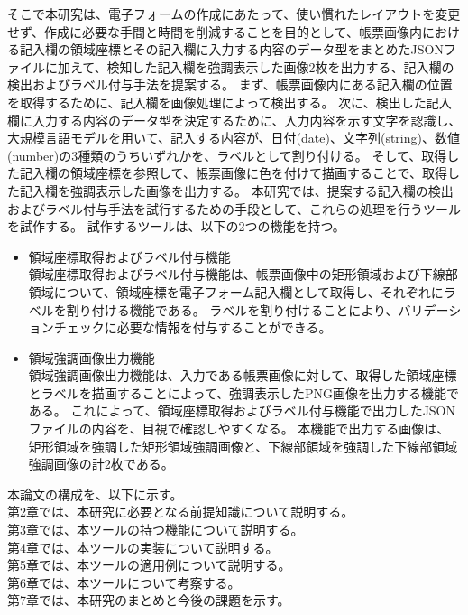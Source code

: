 そこで本研究は、電子フォームの作成にあたって、使い慣れたレイアウトを変更せず、作成に必要な手間と時間を削減することを目的として、帳票画像内における記入欄の領域座標とその記入欄に入力する内容のデータ型をまとめたJSONファイルに加えて、検知した記入欄を強調表示した画像2枚を出力する、記入欄の検出およびラベル付与手法を提案する。
まず、帳票画像内にある記入欄の位置を取得するために、記入欄を画像処理によって検出する。
次に、検出した記入欄に入力する内容のデータ型を決定するために、入力内容を示す文字を認識し、大規模言語モデルを用いて、記入する内容が、日付(date)、文字列(string)、数値(number)の3種類のうちいずれかを、ラベルとして割り付ける。
そして、取得した記入欄の領域座標を参照して、帳票画像に色を付けて描画することで、取得した記入欄を強調表示した画像を出力する。
本研究では、提案する記入欄の検出およびラベル付与手法を試行するための手段として、これらの処理を行うツールを試作する。
試作するツールは、以下の2つの機能を持つ。

\begin{itemize}
    \item 領域座標取得およびラベル付与機能\\
        領域座標取得およびラベル付与機能は、帳票画像中の矩形領域および下線部領域について、領域座標を電子フォーム記入欄として取得し、それぞれにラベルを割り付ける機能である。
        ラベルを割り付けることにより、バリデーションチェック\cite{バリデーションチェック}に必要な情報を付与することができる。
    \item 領域強調画像出力機能\\
        領域強調画像出力機能は、入力である帳票画像に対して、取得した領域座標とラベルを描画することによって、強調表示したPNG画像を出力する機能である。
        これによって、領域座標取得およびラベル付与機能で出力したJSONファイルの内容を、目視で確認しやすくなる。
        本機能で出力する画像は、矩形領域を強調した矩形領域強調画像と、下線部領域を強調した下線部領域強調画像の計2枚である。
\end{itemize}

本論文の構成を、以下に示す。\\
第2章では、本研究に必要となる前提知識について説明する。\\
第3章では、本ツールの持つ機能について説明する。\\
第4章では、本ツールの実装について説明する。\\
第5章では、本ツールの適用例について説明する。\\
第6章では、本ツールについて考察する。\\
第7章では、本研究のまとめと今後の課題を示す。